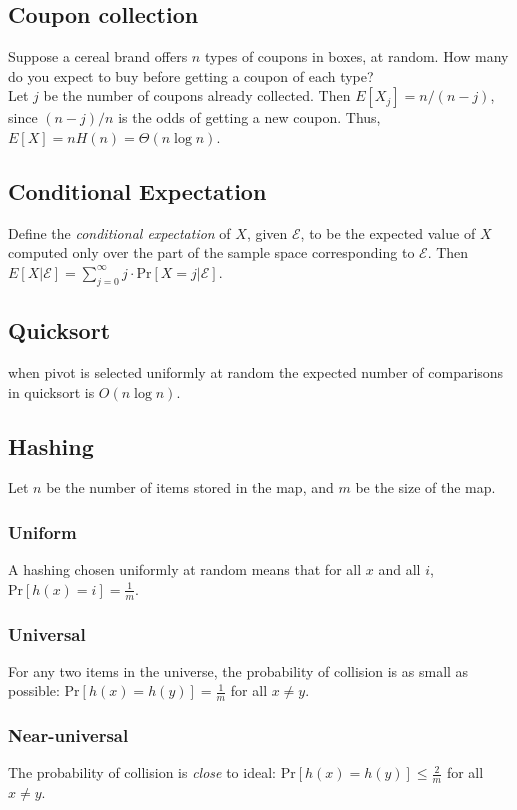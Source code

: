 \subsection{Coupon collection}
Suppose a cereal brand offers $n$ types of coupons in boxes, at random. How many do you expect to buy before getting a coupon of each type?\\

Let $j$ be the number of coupons already collected. Then $E[ X_{j}] = n / (n - j)$, since $( n - j ) / n$ is the odds of getting a new coupon. Thus, $E[X] = nH(n) = \Theta(n \log n)$.

\subsection{Conditional Expectation}
Define the \emph{conditional expectation} of $X$, given $\mathscr{E}$, to be the expected value of $X$ computed only over the part of the sample space corresponding to $\mathscr{E}$. Then $E[ X | \mathscr{E} ] =  \sum_{j=0}^{\infty} j \cdot \text{Pr} [ X = j | \mathscr{E} ]$.


\subsection{Quicksort}

when pivot is selected uniformly at random the expected number of comparisons in quicksort is $O(n \log n)$.


\subsection{Hashing}
Let $n$ be the number of items stored in the map, and $m$ be the size of the map.

\subsubsection{Uniform}
A hashing chosen uniformly at random means that for all $x$ and all $i$, $\text{Pr}[h(x) = i] = \frac{1}{m}$.

\subsubsection{Universal}
For any two items in the universe, the probability of collision is as small as possible: $\text{Pr}[h(x) = h(y)] = \frac{1}{m}$ for all $x \neq y$.

\subsubsection{Near-universal}
The probability of collision is \emph{close} to ideal: $\text{Pr}[h(x) = h(y)] \leq \frac{2}{m}$ for all $x \neq y$.

